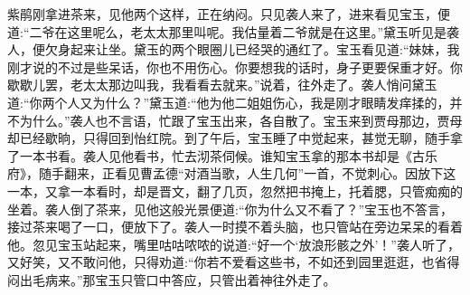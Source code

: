 \begin{parag}
    紫鹃刚拿进茶来，见他两个这样，正在纳闷。只见袭人来了，进来看见宝玉，便道:“二爷在这里呢么，老太太那里叫呢。我估量着二爷就是在这里。”黛玉听见是袭人，便欠身起来让坐。黛玉的两个眼圈儿已经哭的通红了。宝玉看见道:“妹妹，我刚才说的不过是些呆话，你也不用伤心。你要想我的话时，身子更要保重才好。你歇歇儿罢，老太太那边叫我，我看看去就来。”说着，往外走了。袭人悄问黛玉道:“你两个人又为什么？”黛玉道:“他为他二姐姐伤心，我是刚才眼睛发痒揉的，并不为什么。”袭人也不言语，忙跟了宝玉出来，各自散了。宝玉来到贾母那边，贾母却已经歇晌，只得回到怡红院。到了午后，宝玉睡了中觉起来，甚觉无聊，随手拿了一本书看。袭人见他看书，忙去沏茶伺候。谁知宝玉拿的那本书却是《古乐府》，随手翻来，正看见曹孟德“对酒当歌，人生几何”一首，不觉刺心。因放下这一本，又拿一本看时，却是晋文，翻了几页，忽然把书掩上，托着腮，只管痴痴的坐着。袭人倒了茶来，见他这般光景便道:“你为什么又不看了？”宝玉也不答言，接过茶来喝了一口，便放下了。袭人一时摸不着头脑，也只管站在旁边呆呆的看着他。忽见宝玉站起来，嘴里咕咕哝哝的说道:“好一个‘放浪形骸之外’！”袭人听了，又好笑，又不敢问他，只得劝道:“你若不爱看这些书，不如还到园里逛逛，也省得闷出毛病来。”那宝玉只管口中答应，只管出着神往外走了。
\end{parag}


